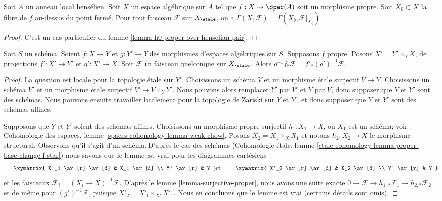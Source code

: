 \begin{lemma}
\label{lemma-h0-proper-over-henselian-local}
Soit $A$ un anneau local hensélien. Soit $X$ un espace algébrique
sur $A$ tel que $f : X \to \Spec(A)$ soit un morphisme propre.
Soit $X_0 \subset X$ la fibre de $f$ au-dessus du point fermé.
Pour tout faisceau $\mathcal{F}$ sur $X_\etale$, on a
$\Gamma(X, \mathcal{F}) = \Gamma(X_0, \mathcal{F}|_{X_0})$.
\end{lemma}

\begin{proof}
C'est un cas particulier du lemme \ref{lemma-h0-proper-over-henselian-pair}.
\end{proof}

\begin{lemma}
\label{lemma-proper-base-change-f-star}
Soit $S$ un schéma. Soient $f : X \to Y$ et $g : Y' \to Y$
des morphismes d'espaces algébriques sur $S$. Supposons $f$ propre.
Posons $X' = Y' \times_Y X$, de projections $f' : X' \to Y'$ et $g' : X' \to X$.
Soit $\mathcal{F}$ un faisceau quelconque sur $X_\etale$. Alors
$g^{-1}f_*\mathcal{F} = f'_*(g')^{-1}\mathcal{F}$.
\end{lemma}

\begin{proof}
La question est locale pour la topologie étale sur $Y'$. Choisissons un schéma
$V$ et un morphisme étale surjectif $V \to Y$. Choisissons un schéma $V'$ et un
morphisme étale surjectif $V' \to V \times_Y Y'$. Nous pouvons alors remplacer
$Y'$ par $V'$ et $Y$ par $V$, donc supposer que $Y$ et $Y'$ sont des schémas.
Nous pouvons ensuite travailler localement pour la topologie de Zariski sur
$Y$ et $Y'$, et donc supposer que $Y$ et $Y'$ sont des schémas affines.

\medskip\noindent
Supposons que $Y$ et $Y'$ soient des schémas affines. Choisissons un morphisme
propre surjectif $h_1 : X_1 \to X$, où $X_1$ est un schéma; voir
Cohomologie des espaces, lemme \ref{spaces-cohomology-lemma-weak-chow}.
Posons $X_2 = X_1 \times_X X_1$ et notons
$h_2 : X_2 \to X$ le morphisme structural. Observons qu'il s'agit d'un schéma.
D'après le cas des schémas
(Cohomologie étale, lemme
\ref{etale-cohomology-lemma-proper-base-change-f-star})
nous savons que le lemme est vrai pour les diagrammes cartésiens
$$
\vcenter{
\xymatrix{
X'_1 \ar[r] \ar[d] & X_1 \ar[d] \\
Y' \ar[r] & Y
}
}
\quad\text{et}\quad
\vcenter{
\xymatrix{
X'_2 \ar[r] \ar[d] & X_2 \ar[d] \\
Y' \ar[r] & Y
}
}
$$
et les faisceaux $\mathcal{F}_i = (X_i \to X)^{-1}\mathcal{F}$.
D'après le lemme \ref{lemma-surjective-proper}, nous avons une suite exacte
$0 \to \mathcal{F} \to h_{1, *}\mathcal{F}_1 \to h_{2, *}\mathcal{F}_2$
et de même pour $(g')^{-1}\mathcal{F}$, puisque
$X'_2 = X'_1 \times_{X'} X'_1$. Nous en concluons que le
lemme est vrai (certains détails sont omis).
\end{proof}

